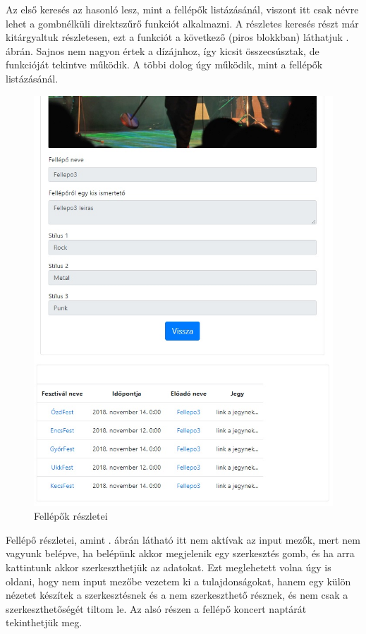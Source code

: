 Az első keresés az hasonló lesz, mint a fellépők listázásánál, viszont itt csak névre lehet a gombnélküli direktszűrő funkciót alkalmazni. A részletes keresés részt már kitárgyaltuk részletesen, ezt a funkciót a következő (piros blokkban) láthatjuk . ábrán. Sajnos nem nagyon értek a dízájnhoz, így kicsit összecsúsztak, de funkcióját tekintve működik. A többi dolog úgy működik, mint a fellépők listázásánál.

\begin{figure}[h!]
\centering
\includegraphics[scale=0.8]{kepek/artistDet.jpg}
\caption{Fellépők részletei}
\label{fig:artistDet}
\end{figure}

Fellépő részletei, amint . ábrán látható itt nem aktívak az input mezők, mert nem vagyunk belépve, ha belépünk akkor megjelenik egy szerkesztés gomb, és ha arra kattintunk akkor szerkeszthetjük az adatokat. Ezt meglehetett volna úgy is oldani, hogy nem input mezőbe vezetem ki a tulajdonságokat, hanem egy külön nézetet készítek a szerkesztésnek és a nem szerkeszthető résznek, és nem csak a szerkeszthetőségét tiltom le. Az alsó részen a fellépő koncert naptárát tekinthetjük meg.

